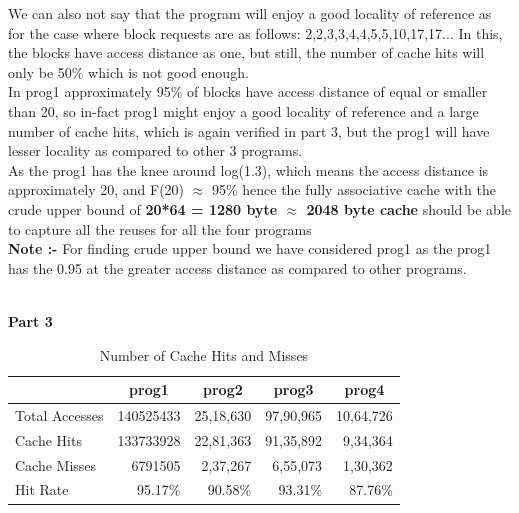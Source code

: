 \documentclass[12pt,oneside,reqno]{amsart}
\begin{document}
We can also not say that the program will enjoy a good locality of reference as for the case where block requests are as follows: 2,2,3,3,4,4,5,5,10,17,17... In this, the blocks have access distance as one, but still, the number of cache hits will only be 50\% which is not good enough.\\

In prog1 approximately 95\% of blocks have access distance of equal or smaller than 20, so in-fact prog1 might enjoy a good locality of reference and a large number of cache hits, which is again verified in part 3, but the prog1 will have lesser locality as compared to other 3 programs.\\

As the prog1 has the knee around log(1.3), which means the access distance is approximately 20, and F(20) $\approx$ 95\% hence the fully associative cache with the crude upper bound of \textbf{20*64 = 1280 byte $\approx$ 2048 byte cache} should be able to capture all the reuses for all the four programs\\

\textbf{Note :-} For finding crude upper bound we have considered prog1 as the prog1 has the 0.95 at the greater access distance as compared to other programs.

\newpage
\begin{LARGE}
		\textbf{\\Part 3\\ }
\end{LARGE}
\begin{table}[h]
\centering
\caption{Number of Cache Hits and Misses}
\begin{tabular}{|l|r|r|r|r|}

\hline
 & \multicolumn{1}{c|}{prog1} & \multicolumn{1}{c|}{prog2} & \multicolumn{1}{c|}{prog3} & \multicolumn{1}{c|}{prog4} \\ \hline
Total Accesses & 140525433 & 25,18,630 & 97,90,965 & 10,64,726 \\
Cache Hits     & 133733928 & 22,81,363 & 91,35,892 & 9,34,364  \\
Cache Misses   & 6791505   & 2,37,267  & 6,55,073  & 1,30,362  \\
\hline
Hit Rate       & 95.17\%   & 90.58\%   & 93.31\%   & 87.76\%  \\
\hline
\end{tabular}
\end{table}
\end{document}

